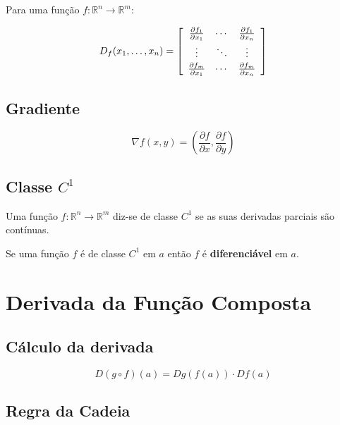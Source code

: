 \documentclass[11pt, a4paper]{article}
\begin{document}
Para uma função $f: \mathbb{R}^n \to \mathbb{R}^m$:

\begin{equation*}
    D_f(x_1, \ldots, x_n) =
    \left[
        \begin{array}{c c c}
            \frac{\partial f_1}{\partial x_1} & \cdots &
            \frac{\partial f_1}{\partial x_n} \vspace{2pt}                   \\
            \vdots                            & \ddots & \vdots \vspace{2pt} \\
            \frac{\partial f_m}{\partial x_1} & \cdots &
            \frac{\partial f_m}{\partial x_n}
        \end{array}
        \right]
\end{equation*}

\subsection{Gradiente}

\begin{equation*}
    \nabla f(x, y) = \left(\frac{\partial f}{\partial x}, \frac{\partial f}{\partial y}\right)
\end{equation*}

\subsection{Classe $C^1$}

Uma função $f: \mathbb{R}^n \to \mathbb{R}^m$ diz-se de classe $C^1$ se as
suas derivadas parciais são contínuas.

Se uma função $f$ é de classe $C^1$ em $a$ então $f$ é \textbf{diferenciável} em
$a$.

\section{Derivada da Função Composta}

\subsection{Cálculo da derivada}

\begin{equation*}
    D(g \circ f)(a) = Dg\left(f(a)\right) \cdot Df(a)
\end{equation*}

\subsection{Regra da Cadeia}
\end{document}
